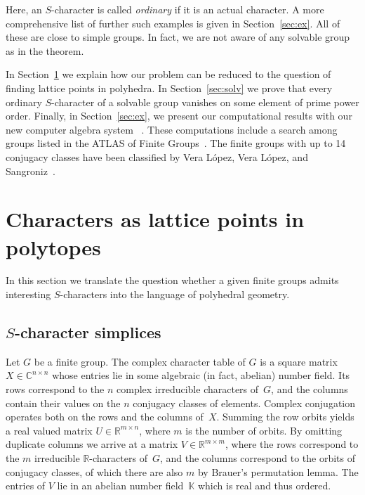 \documentclass[12pt,leqno,a4paper]{amsart}
\newcommand{\CC}{{\mathbb{C}}}
\newcommand{\KK}{{\mathbb{K}}}
\newcommand{\RR}{{\mathbb{R}}}
\newcommand{\OSCAR}{{\sf{OSCAR}}\xspace}
\theoremstyle{definition}
\begin{document}
Here, an $S$-character is called \emph{ordinary} if it is an actual character.
A more comprehensive list of further such examples is given in
Section~\ref{sec:ex}. All of these are close to simple groups.
In fact, we are not aware of any solvable group as in the theorem.
\medskip

In Section~\ref{sec:poly} we explain how our problem can be reduced to the
question of finding lattice points in polyhedra. In Section~\ref{sec:solv} we
prove that every ordinary $S$-character of a solvable group vanishes on some
element of prime power order. Finally, in Section~\ref{sec:ex}, we present our
computational results with our new computer algebra system
\OSCAR~\cite{OSCAR-book,OSCAR}.
These computations include a search among groups listed in the ATLAS of Finite
Groups~\cite{Atl}. The finite groups with up to 14 conjugacy classes have been
classified by Vera L\'opez, Vera L\'opez, and
Sangroniz~\cite{VLVL85,VLVL86,VS07}.


\section{Characters as lattice points in polytopes}   \label{sec:poly}
In this section we translate the question whether a given finite groups
admits interesting $S$-characters into the language of polyhedral geometry.

\subsection{$S$-character simplices}
Let $G$ be a finite group. The complex character table of $G$ is a square matrix
$X\in\CC^{n\times n}$ whose entries lie in some algebraic (in fact, abelian)
number field. Its rows correspond to the $n$ complex irreducible characters
of~$G$, and the columns contain their values on the $n$ conjugacy classes of
elements. Complex conjugation operates both on the rows and the columns of~$X$.
Summing the row orbits yields a real valued matrix $U\in\RR^{m\times n}$, where
$m$ is the number of orbits. By omitting duplicate columns we arrive at a matrix
$V\in\RR^{m\times m}$, where the rows correspond to the $m$ irreducible
$\RR$-characters of~$G$, and the columns correspond to the orbits of conjugacy
classes, of which there are also $m$ by Brauer's permutation lemma. The entries
of $V$ lie in an abelian number field~$\KK$ which is real and thus ordered.
\end{document}
